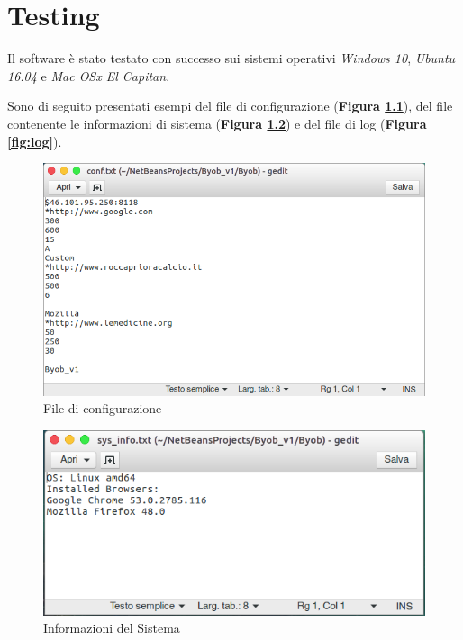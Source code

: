 \chapter{Testing}

Il software \`{e} stato testato con successo sui sistemi operativi \textit{Windows 10}, \textit{Ubuntu 16.04} e \textit{Mac OSx El Capitan}.  

\vspace*{0.5cm}
Sono di seguito presentati esempi del file di configurazione (\textbf{Figura \ref{fig:conf}}), del file contenente le informazioni di sistema (\textbf{Figura \ref{fig:sys_info}}) e del file di log (\textbf{Figura \ref{fig:log}}).

\vspace*{0.5cm}
\begin{figure}[htp]
\centering
\includegraphics[width=0.7\linewidth]{imgs/conf}
\caption{File di configurazione}
\label{fig:conf}
\end{figure}

\begin{figure}[htp]
\centering
\includegraphics[width=0.7\linewidth]{imgs/sys_info}
\caption{Informazioni del Sistema}
\label{fig:sys_info}
\end{figure}

